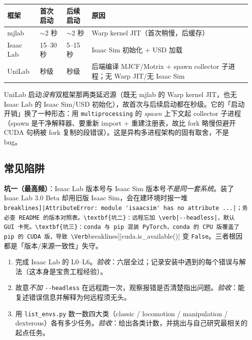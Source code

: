 \begin{center}
\small
\begin{tabular}{@{}llll@{}}
\toprule
框架 & 首次启动 & 后续启动 & 原因 \\
\midrule
mjlab & $\sim$2 秒 & $\sim$2 秒 & Warp kernel JIT（首次稍慢，后缓存） \\
Isaac Lab & 15--30 秒 & 5--15 秒 & Isaac Sim 初始化 + USD 加载 \\
UniLab & 秒级 & 秒级 & 后端编译 MJCF/Motrix + spawn collector 子进程；无 Warp JIT/无 Isaac Sim \\
\bottomrule
\end{tabular}
\end{center}

\begin{finenote}
UniLab 启动\emph{没有}双框架那两类延迟源（既无 mjlab 的 Warp kernel JIT，也无 Isaac Lab 的 Isaac Sim/USD 初始化），故首次与后续启动都在秒级。它的「启动开销」换了一种形态：用 \texttt{multiprocessing} 的 \emph{spawn} 上下文起 collector 子进程（spawn 是干净解释器、要重新 import + 重建注册表，故比 fork 略慢但避开 CUDA 句柄被 fork 复制的段错误）。这是异构多进程架构的固有取舍，不是 bug。
\end{finenote}

\subsection{常见陷阱}

\begin{pitfall}
\textbf{坑一（最高频）}：Isaac Lab 版本号与 Isaac Sim 版本号\emph{不是同一套系统}。装了 Isaac Lab 3.0 Beta 却用旧版 Isaac Sim，会在建环境时报一堆 \Verb[breaklines]|AttributeError: module 'isaacsim' has no attribute ...|；务必查 README 的版本对照表。\textbf{坑二}：远程忘加 \verb|--headless|，默认 GUI 卡死。\textbf{坑三}：conda 与 pip 混装 PyTorch，conda 的 CPU 版覆盖了 pip 的 CUDA 版，导致 \Verb[breaklines]|cuda.is_available()| 变 \verb|False|。三者根因都是「版本/来源一致性」失守。
\end{pitfall}

\begin{practice}
\begin{enumerate}
  \item 完成 Isaac Lab 的 L0--L6。\emph{验收}：六层全过；记录安装中遇到的每个错误与解法（这本身是宝贵工程经验）。
  \item 故意\emph{不加} \verb|--headless| 在远程跑一次，观察报错是否清楚指出问题。\emph{验收}：能复述错误信息并解释为何远程须无头。
  \item 用 \verb|list_envs.py| 数一数四大类（classic / locomotion / manipulation / dexterous）各有多少任务。\emph{验收}：给出各类计数，并挑出与自己研究最相关的起点任务。
\end{enumerate}
\end{practice}

